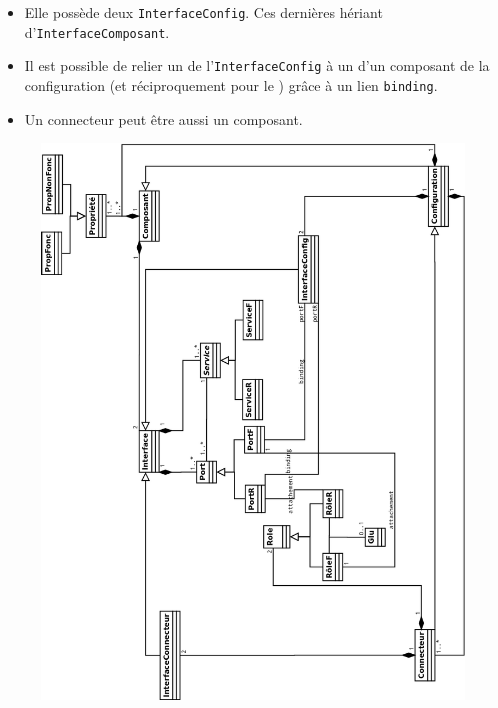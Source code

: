 \begin{itemize}
\item 
  Elle possède deux \verb+InterfaceConfig+. Ces dernières hériant d'\verb+InterfaceComposant+.
\item
  Il est possible de relier un \portr{} de l'\verb+InterfaceConfig+ à un \portr{} d'un composant de la configuration (et réciproquement pour le \portf) grâce à un lien \verb+binding+.
\item
  Un connecteur peut être aussi un composant.
\end{itemize}

\begin{figure}[htb]
  \includegraphics[scale=0.31]{img/M2}
\end{figure}
